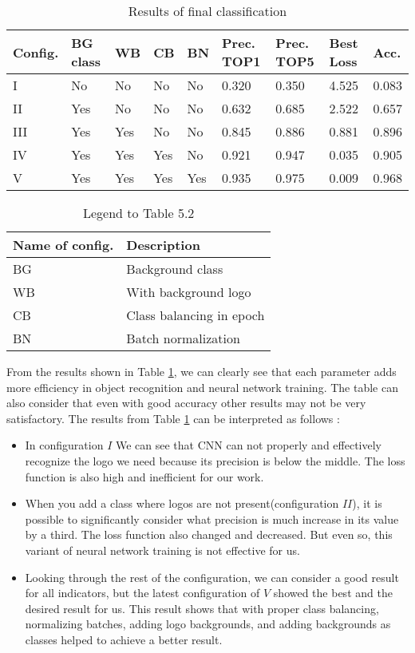 \begin{table}[hbp]
	\centering
	\caption{Results of final classification}
	\label{tab:sample}
	\begin{tabular}{lllll|llll}
		\toprule
		Config.		 	& BG class 	& WB 	& CB 	& BN 	& Prec. TOP1 	& Prec. TOP5 	& 	Best Loss  	& Acc.	\\ \midrule
		I 			  	& No 		& No	& No 	& No 	& 0.320			& 0.350 		& 	4.525		& 0.083	\\
		II 			  	& Yes 		& No	& No 	& No 	& 0.632			& 0.685 		& 	2.522		& 0.657	\\
		III 			& Yes 		& Yes	& No 	& No 	& 0.845			& 0.886 		& 	0.881		& 0.896	\\
		IV 				& Yes 		& Yes	& Yes 	& No 	& 0.921			& 0.947 		& 	0.035		& 0.905	\\
		V 				& Yes		& Yes	& Yes	& Yes	& 0.935			& 0.975			& 	0.009		& 0.968	\\
		\bottomrule
	\end{tabular}
\end{table}

\begin{table}
	\centering
	\caption{Legend to Table 5.2}
	\begin{tabular}{ll}
		\toprule
		Name of config. & Description 				\\ \midrule
		BG 				& Background class 			\\
		WB				& With background logo 		\\
		CB 				& Class balancing in epoch 	\\
		BN 				& Batch normalization		\\
		\bottomrule
	\end{tabular}
	
\end{table}


\noindent From the results shown in Table \ref{tab:sample}, we can clearly see that each parameter adds more efficiency in object recognition and neural network training. The table can also consider that even with good accuracy other results may not be very satisfactory. The results from Table \ref{tab:sample} can be interpreted as follows :
\begin{itemize}
	\item In configuration $I$ We can see that CNN can not properly and effectively recognize the logo we need because its precision is below the middle. The loss function is also high and inefficient for our work.
	\item When you add a class where logos are not present(configuration $II$), it is possible to significantly consider what precision is much increase in its value by a third. The loss function also changed and decreased. But even so, this variant of neural network training is not effective for us.
	\item Looking through the rest of the configuration, we can consider a good result for all indicators, but the latest configuration of $V$ showed the best and the desired result for us. This result shows that with proper class balancing, normalizing batches, adding logo backgrounds, and adding backgrounds as classes helped to achieve a better result.
\end{itemize}


